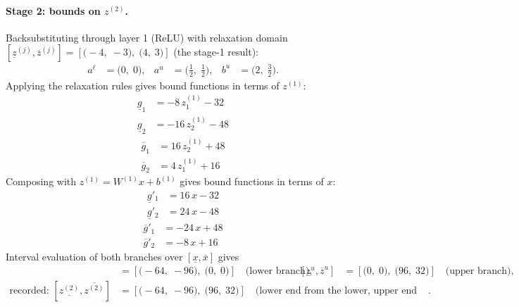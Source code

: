 \documentclass[11pt]{article}
\begin{document}
\paragraph{Stage 2: bounds on $z^{(2)}$.}
Backsubstituting through layer 1 (ReLU) with relaxation domain $[\underline{z}^{(j)}, \overline{z}^{(j)}] = [\bigl(-4,\; -3\bigr),\; \bigl(4,\; 3\bigr)]$ (the stage-1 result):
\begin{align*}
a^{\ell} &= \bigl(0,\; 0\bigr), & a^{u} &= \bigl(\frac{1}{2},\; \frac{1}{2}\bigr), & b^{u} &= \bigl(2,\; \frac{3}{2}\bigr).
\end{align*}
Applying the relaxation rules gives bound functions in terms of $z^{(1)}$:
\begin{align*}
\underline{g}_{1} &= -8\,z^{(1)}_{1} - 32 \\
\underline{g}_{2} &= -16\,z^{(1)}_{2} - 48
\end{align*}
\begin{align*}
\overline{g}_{1} &= 16\,z^{(1)}_{2} + 48 \\
\overline{g}_{2} &= 4\,z^{(1)}_{1} + 16
\end{align*}
Composing with $z^{(1)} = W^{(1)} x + b^{(1)}$ gives bound functions in terms of $x$:
\begin{align*}
\underline{g}'_{1} &= 16\,x - 32 \\
\underline{g}'_{2} &= 24\,x - 48
\end{align*}
\begin{align*}
\overline{g}'_{1} &= -24\,x + 48 \\
\overline{g}'_{2} &= -8\,x + 16
\end{align*}
Interval evaluation of both branches over $[\underline{x}, \overline{x}]$ gives
\begin{align*}
[\underline{z}^{\ell}, \overline{z}^{\ell}] &= [\bigl(-64,\; -96\bigr),\; \bigl(0,\; 0\bigr)] \quad\text{(lower branch)}, & [\underline{z}^{u}, \overline{z}^{u}] &= [\bigl(0,\; 0\bigr),\; \bigl(96,\; 32\bigr)] \quad\text{(upper branch)}, \\
\text{recorded: } [\underline{z^{(2)}}, \overline{z^{(2)}}] &= [\bigl(-64,\; -96\bigr),\; \bigl(96,\; 32\bigr)] \quad\text{(lower end from the lower, upper end from the upper branch)}.
\end{align*}
\end{document}
